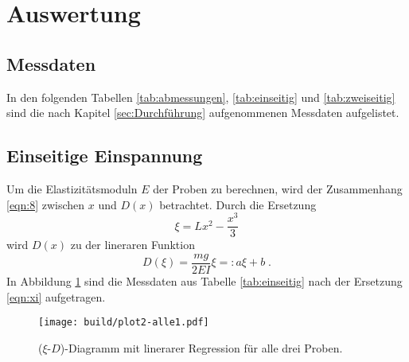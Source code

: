\section{Auswertung}
\label{sec:Auswertung}
\subsection{Messdaten}
\label{sec:mess}
In den folgenden Tabellen \ref{tab:abmessungen}, \ref{tab:einseitig} und \ref{tab:zweiseitig} sind die nach Kapitel 
\ref{sec:Durchführung} aufgenommenen Messdaten aufgelistet.



\subsection{Einseitige Einspannung}
\label{sec:einseitig}
Um die Elastizitätsmoduln $E$ der Proben zu berechnen, wird der Zusammenhang \eqref{eqn:8} zwischen $x$ und $D(x)$ betrachtet. Durch die Ersetzung
\begin{equation}
    \xi=Lx^2-\frac{x^3}{3}
    \label{eqn:xi}
\end{equation}  
wird $D(x)$ zu der lineraren Funktion 
\begin{equation}
    D(\xi)=\frac{mg}{2EI}\xi=:a\xi+b \;.
    \label{eqn:D(xi)}
\end{equation}
In Abbildung \ref{fig:einseitig} sind die Messdaten aus Tabelle \ref{tab:einseitig} nach der Ersetzung \eqref{eqn:xi} aufgetragen. 

\begin{figure}[H]
    \centering
    \texttt{[image: build/plot2-alle1.pdf]}
    \caption{($\xi$-$D$)-Diagramm mit linerarer Regression für alle drei Proben.}
    \label{fig:einseitig}
\end{figure}


